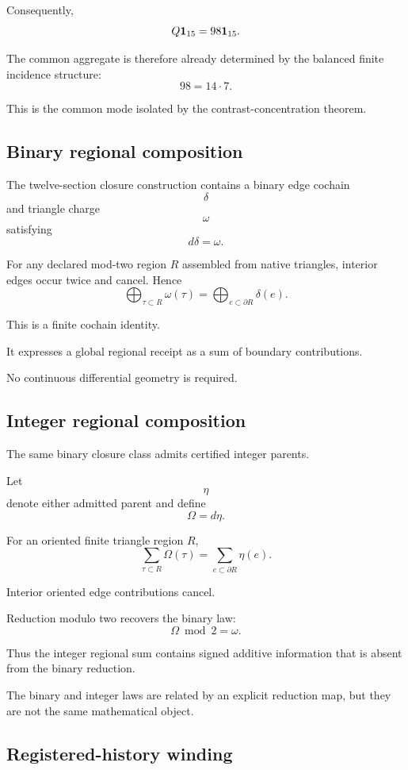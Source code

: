 Consequently,
\[
Q\mathbf{1}_{15}
=
98\mathbf{1}_{15}.
\]

The common aggregate is therefore already determined by the balanced
finite incidence structure:
\[
98=14\cdot7.
\]

This is the common mode isolated by the contrast-concentration
theorem.

\subsection{Binary regional composition}

The twelve-section closure construction contains a binary edge
cochain
\[
\delta
\]
and triangle charge
\[
\omega
\]
satisfying
\[
d\delta=\omega.
\]

For any declared mod-two region \(R\) assembled from native
triangles, interior edges occur twice and cancel. Hence
\[
\bigoplus_{\tau\subset R}\omega(\tau)
=
\bigoplus_{e\subset\partial R}\delta(e).
\]

This is a finite cochain identity.

It expresses a global regional receipt as a sum of boundary
contributions.

No continuous differential geometry is required.

\subsection{Integer regional composition}

The same binary closure class admits certified integer parents.

Let
\[
\eta
\]
denote either admitted parent and define
\[
\Omega=d\eta.
\]

For an oriented finite triangle region \(R\),
\[
\sum_{\tau\subset R}\Omega(\tau)
=
\sum_{e\subset\partial R}\eta(e).
\]

Interior oriented edge contributions cancel.

Reduction modulo two recovers the binary law:
\[
\Omega\bmod2=\omega.
\]

Thus the integer regional sum contains signed additive information
that is absent from the binary reduction.

The binary and integer laws are related by an explicit reduction map,
but they are not the same mathematical object.

\subsection{Registered-history winding}

